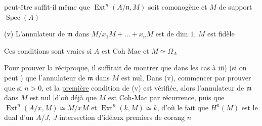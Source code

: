 
peut-être suffit-il même que $\operatorname{Ext}^n(A/\mathfrak n,M)$ soit comonogène et $M$ de support $\operatorname{Spec}(A)$

(v) L'annulateur de $\mathfrak m$ dans $M/x_1M+\ldots+x_nM$ est de dim $1$, $M$ est fidèle

Ces conditions sont vraies si $\boxed{A\text{ est Coh Mac et }M\simeq\Omega_A}$

Pour prouver la réciproque, il suffirait de montrer que dans les cas  à iii) (si on peut ) que  l'annulateur de $\mathfrak m$ dans $M$ est nul,  Dans (v),   commencer par prouver que si $n>0$, et la \uline{première} condition de (v) est vérifiée, alors l'annulateur de $\mathfrak m$ dans $M$ est nul [d'où déjà que $M$ est Coh-Mac par récurrence, puis que $\operatorname{Ext}^n(A/\underline{x},M)\simeq M/\underline{x}M$ et $\operatorname{Ext}^n(k,M)\simeq k$, d'où le fait que $H^n(M)$ est le dual d'un $A/J$, $J$ intersection d'idéaux premiers de corang $n$

